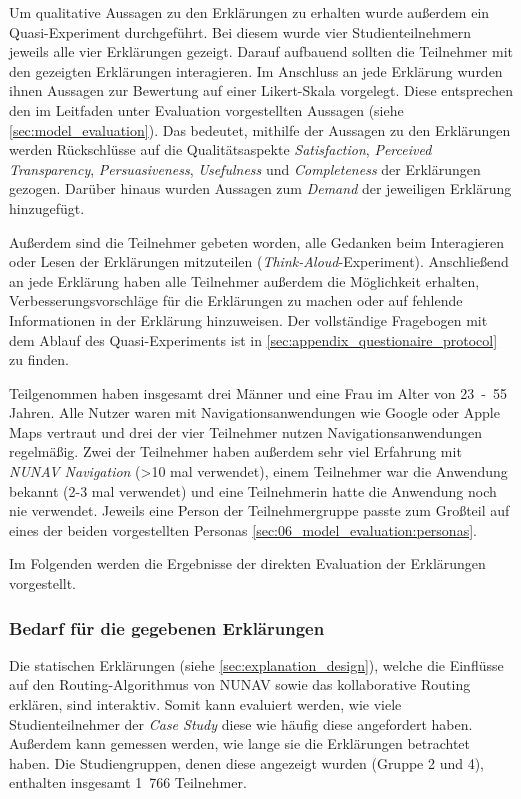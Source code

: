 Um qualitative Aussagen zu den Erklärungen zu erhalten wurde außerdem ein Quasi-Experiment durchgeführt. Bei diesem wurde vier Studienteilnehmern jeweils alle vier Erklärungen gezeigt. Darauf aufbauend sollten die Teilnehmer mit den gezeigten Erklärungen interagieren. Im Anschluss an jede Erklärung wurden ihnen Aussagen zur Bewertung auf einer Likert-Skala vorgelegt. Diese entsprechen den im Leitfaden unter Evaluation vorgestellten Aussagen (siehe \autoref{sec:model_evaluation}). Das bedeutet, mithilfe der Aussagen zu den Erklärungen werden Rückschlüsse auf die Qualitätsaspekte \textit{Satisfaction}, \textit{Perceived Transparency}, \textit{Persuasiveness}, \textit{Usefulness} und \textit{Completeness} der Erklärungen gezogen. Darüber hinaus wurden Aussagen zum \textit{Demand} der jeweiligen Erklärung hinzugefügt.

Außerdem sind die Teilnehmer gebeten worden, alle Gedanken beim Interagieren oder Lesen der Erklärungen mitzuteilen (\textit{Think-Aloud}-Experiment). Anschließend an jede Erklärung haben alle Teilnehmer außerdem die Möglichkeit erhalten, Verbesserungsvorschläge für die Erklärungen zu machen oder auf fehlende Informationen in der Erklärung hinzuweisen. Der vollständige Fragebogen mit dem Ablauf des Quasi-Experiments ist in \autoref{sec:appendix_questionaire_protocol} zu finden.

Teilgenommen haben insgesamt drei Männer und eine Frau im Alter von 23~-~55 Jahren. Alle Nutzer waren mit Navigationsanwendungen wie Google oder Apple Maps vertraut und drei der vier Teilnehmer nutzen Navigationsanwendungen regelmäßig. Zwei der Teilnehmer haben außerdem sehr viel Erfahrung mit \textit{NUNAV Navigation} (>10 mal verwendet), einem Teilnehmer war die Anwendung bekannt (2-3 mal verwendet) und eine Teilnehmerin hatte die Anwendung noch nie verwendet. Jeweils eine Person der Teilnehmergruppe passte zum Großteil auf eines der beiden vorgestellten Personas \autoref{sec:06_model_evaluation:personas}.

Im Folgenden werden die Ergebnisse der direkten Evaluation der Erklärungen vorgestellt.

\subsubsection{Bedarf für die gegebenen Erklärungen}
\label{sec:demand_qualitative_evaluation}

Die statischen Erklärungen (siehe \autoref{sec:explanation_design}), welche die Einflüsse auf den Routing-Algorithmus von NUNAV sowie das kollaborative Routing erklären, sind interaktiv. Somit kann evaluiert werden, wie viele Studienteilnehmer der \textit{Case Study} diese wie häufig diese angefordert haben. Außerdem kann gemessen werden, wie lange sie die Erklärungen betrachtet haben. Die Studiengruppen, denen diese angezeigt wurden (Gruppe 2 und 4), enthalten insgesamt 1~766 Teilnehmer.

